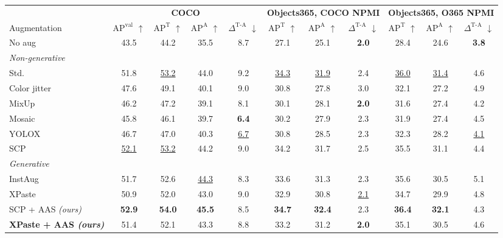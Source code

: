 \begin{tabular}{l cccc ccc ccc}
\toprule
& \multicolumn{4}{c}{\textbf{COCO}} & \multicolumn{3}{c}{\textbf{Objects365, COCO NPMI}} & \multicolumn{3}{c}{\textbf{Objects365, O365 NPMI}} \\
\cmidrule(lr){2-5} \cmidrule(lr){6-8} \cmidrule(lr){9-11}
Augmentation & $\text{AP}^{\text{val}}$ $\uparrow$ & $\text{AP}^{\text{T}}$ $\uparrow$ & $\text{AP}^{\text{A}}$ $\uparrow$ & $\Delta^{\text{T-A}}$ $\downarrow$ & $\text{AP}^{\text{T}}$ $\uparrow$ & $\text{AP}^{\text{A}}$ $\uparrow$ & $\Delta^{\text{T-A}}$ $\downarrow$ & $\text{AP}^{\text{T}}$ $\uparrow$ & $\text{AP}^{\text{A}}$ $\uparrow$ & $\Delta^{\text{T-A}}$ $\downarrow$ \\
\midrule
No aug & 43.5 & 44.2 & 35.5 & 8.7 & 27.1 & 25.1 & \textbf{2.0} & 28.4 & 24.6 & \textbf{3.8} \\
\midrule
\multicolumn{11}{l}{\emph{Non-generative}} \\
Std. & 51.8 & \underline{53.2} & 44.0 & 9.2 & \underline{34.3} & \underline{31.9} & 2.4 & \underline{36.0} & \underline{31.4} & 4.6 \\
Color jitter & 47.6 & 49.1 & 40.1 & 9.0 & 30.8 & 27.8 & 3.0 & 32.1 & 27.2 & 4.9 \\
MixUp & 46.2 & 47.2 & 39.1 & 8.1 & 30.1 & 28.1 & \textbf{2.0} & 31.6 & 27.4 & 4.2 \\
Mosaic & 45.8 & 46.1 & 39.7 & \textbf{6.4} & 30.2 & 27.9 & 2.3 & 31.9 & 27.4 & 4.5 \\
YOLOX & 46.7 & 47.0 & 40.3 & \underline{6.7} & 30.8 & 28.5 & 2.3 & 32.3 & 28.2 & \underline{4.1} \\
SCP & \underline{52.1} & \underline{53.2} & 44.2 & 9.0 & 34.2 & 31.7 & 2.5 & 35.5 & 31.1 & 4.4 \\
\midrule
\multicolumn{11}{l}{\emph{Generative}} \\
InstAug & 51.7 & 52.6 & \underline{44.3} & 8.3 & 33.6 & 31.3 & 2.3 & 35.6 & 30.5 & 5.1 \\
XPaste & 50.9 & 52.0 & 43.0 & 9.0 & 32.9 & 30.8 & \underline{2.1} & 34.7 & 29.9 & 4.8 \\
\midrule
\rowcolor{oursrow} SCP + AAS \emph{(ours)} & \textbf{52.9} & \textbf{54.0} & \textbf{45.5} & 8.5 & \textbf{34.7} & \textbf{32.4} & 2.3 & \textbf{36.4} & \textbf{32.1} & 4.3 \\
\rowcolor{oursrow} \textbf{XPaste + AAS \emph{(ours)}} & 51.4 & 52.1 & 43.3 & 8.8 & 33.2 & 31.2 & \textbf{2.0} & 35.1 & 30.5 & 4.6 \\
\bottomrule
\end{tabular}
